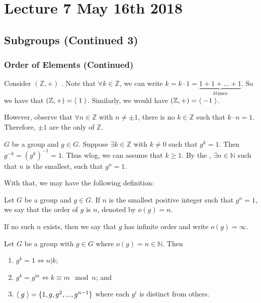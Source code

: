 \chapter{Lecture 7 May 16th 2018}%
\label{chp:lecture_7_may_16th_2018}

\section{Subgroups (Continued 3)}%
\label{sec:subgroups_continued_3}

\subsection{Order of Elements (Continued)}%
\label{sub:order_of_elements_continued}

\begin{eg}
  Consider $(\mathbb{Z}, +)$ . Note that $\forall k \in \mathbb{Z}$, we can write $k = k \cdot 1 = \underbrace{1 + 1 + \hdots + 1}_{k \text{times}}$. So we have that $(\mathbb{Z} , +) = \langle \; 1 \; \rangle$. Similarly, we would have $(\mathbb{Z} , +) = \langle \; -1 \; \rangle$.

\noindent However, observe that $\forall n \in \mathbb{Z}$ with $n \neq \pm 1$, there is no $k \in \mathbb{Z} $ such that $k \cdot n = 1$. Therefore, $\pm 1$ are the only  of $\mathbb{Z}$.
\end{eg}

 $G$ be a group and $g \in G$. Suppose $\exists k \in \mathbb{Z}$ with $k \neq 0$ such that $g^k = 1$. Then $g^{-k} = ( g^k )^{-1} = 1$. Thus wlog, we can assume that $k \geq 1$. By the , $\exists n \in \mathbb{N}$ such that $n$ is the smallest, such that $g^n = 1$.

With that, we may have the following definition:

\begin{defn}
\label{defn:order_of_an_element}
  Let $G$ be a group and $g \in G$. If $n$ is the smallest positive integer such that $g^n = 1$, we say that the order of $g$ is $n$, denoted by $o(g) = n$.

  \noindent If no such $n$ exists, then we say that $g$ has infinite order and write $o(g) = \infty$.
\end{defn}

\begin{propo}
\label{propo:properties_of_elements_of_finite_order}
  Let $G$ be a group with $g \in G$ where $o(g) = n \in \mathbb{N}$. Then
  \begin{enumerate}
    \item $g^k = 1 \iff n | k$;
    \item $g^k = g^m \iff k \equiv m \mod n$; and
    \item $\langle \; g \; \rangle = \{1, g, g^2, ..., g^{n - 1} \}$ where each $g^i$ is distinct from others.
  \end{enumerate}
\end{propo}

